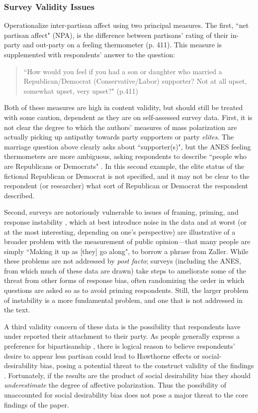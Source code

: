 \documentclass[12pt]{article}
\begin{document}
\subsubsection{Survey Validity Issues}
\citeauthor{iyengar2012affect} Operationalize inter-partisan affect using two principal measures. The first, ``net partisan affect" (NPA), is the difference between partisans' rating of their in-party and out-party on a feeling thermometer (p. 411). This measure is supplemented with respondents' answer to the question: 
\begin{quote}
``How would you feel if you had a son or daughter who married a Republican/Democrat (Conservative/Labor) supporter? Not at all upset, somewhat upset, very upset?" (p.411)
\end{quote}
Both of these measures are high in content validity, but should still be treated with some caution, dependent as they are on self-assessed survey data. First, it is not clear the degree to which the authors' measures of mass polarization are actually picking up antipathy towards party supporters or party \textit{elites}. The marriage question above clearly asks about ``supporter(s)", but the ANES feeling thermometers are more ambiguous, asking respondents to describe ``people who are Republicans or Democrats" \citep[p. 412]{iyengar2012affect}. In this second example, the elite status of the fictional Republican or Democrat is not specified, and it may not be clear to the respondent (or researcher) what sort of Republican or Democrat the respondent described.

Second, surveys are notoriously vulnerable to issues of framing, priming, and response instability \citep[p. 53--75]{zaller1992nature}, which at best introduce noise in the data and at worst (or at the most interesting, depending on one's perspective) are illustrative of a broader problem with the measurement of public opinion---that many people are simply ``Making it up as [they] go along", to borrow a phrase from Zaller. While these problems are not addressed by \citeauthor{iyengar2012affect} \textit{post facto}; surveys (including the ANES, from which much of these data are drawn) take steps to ameliorate some of the threat from other forms of response bias, often randomizing the order in which questions are asked so as to avoid priming respondents. Still, the larger problem of instability is a more fundamental problem, and one that is not addressed in the text.

A third validity concern of these data is the possibility that respondents have under reported their attachment to their party. As people generally express a preference for bipartisanship \citep{harbridge2014public}, there is logical reason to believe respondents' desire to appear less partisan could lead to Hawthorne effects or social-desirability bias, posing a potential threat to the construct validity of the findings \citep[p. 73, Table 3.1 Item 8]{shadish2002experimental}. Fortunately, if the results are the product of social desirability bias they should \textit{underestimate} the degree of affective polarization. Thus the possibility of unaccounted for social desirability bias does not pose a major threat to the core findings of the paper.
\end{document}
